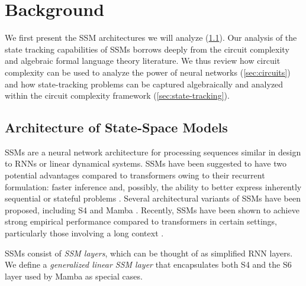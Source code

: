 \section{Background}

We first present the SSM architectures we will analyze (\ref{sec:ssms}).
Our analysis of the state tracking capabilities of SSMs borrows deeply from the circuit complexity and algebraic formal language theory literature. We thus review how circuit complexity can be used to analyze the power of neural networks (\ref{sec:circuits}) and how state-tracking problems can be captured algebraically and analyzed within the circuit complexity framework (\ref{sec:state-tracking}).

\subsection{Architecture of State-Space Models} \label{sec:ssms}

SSMs are a neural network architecture for processing sequences similar in design to RNNs or linear dynamical systems. SSMs have been suggested to have two potential advantages compared to transformers owing to their recurrent formulation: faster inference and, possibly, the ability to better express inherently sequential or stateful problems \citep{gu2021combining,gu2022blog}. Several architectural variants of SSMs have been proposed, including S4 \citep{gu2022efficiently} and Mamba \citep{gu2023mamba}. Recently, SSMs have been shown to achieve strong empirical performance compared to transformers in certain settings, particularly those involving a long context \citep{gu2023mamba,wang2024mambabyte}.

SSMs consist of \emph{SSM layers}, which can be thought of as simplified RNN layers. We define a \emph{generalized linear SSM layer} that encapsulates both S4 \citep{gu2022efficiently} and the S6 layer used by Mamba \citep{gu2023mamba} as special cases.

